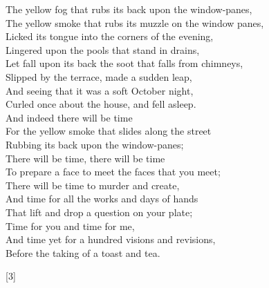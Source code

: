 \documentclass{article}
\begin{document}
\begin{multicols}{2}

\begin{minipage}{10cm}
    \onehalfspacing
    \bigskip
    \centering
    The yellow fog that rubs its back upon the window-panes,\\
    The yellow smoke that rubs its muzzle on the window panes,\\
    Licked its tongue into the corners of the evening,\\
    Lingered upon the pools that stand in drains,\\
    Let fall upon its back the soot that falls from chimneys,\\
    Slipped by the terrace, made a sudden leap,\\
    And seeing that it was a soft October night,\\
    Curled once about the house, and fell asleep.\\
    And indeed there will be time\\
    For the yellow smoke that slides along the street\\
    Rubbing its back upon the window-panes;\\
    There will be time, there will be time\\
    To prepare a face to meet the faces that you meet;\\
    There will be time to murder and create,\\
    And time for all the works and days of hands\\
    That lift and drop a question on your plate;\\
    Time for you and time for me,\\
    And time yet for a hundred visions and revisions,\\
    Before the taking of a toast and tea.
    \begin{center}[3]\end{center}
\end{minipage}

\begin{minipage}{9cm}
\begin{center}


\end{center}
\end{minipage}
\end{multicols}
\end{document}

